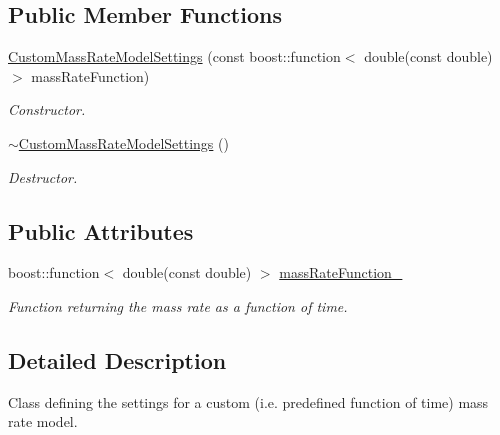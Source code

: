 \subsection*{Public Member Functions}
\begin{DoxyCompactItemize}
\item 
\hyperlink{classtudat_1_1simulation__setup_1_1CustomMassRateModelSettings_af4ba6218e0a40b784e4c519fd16240a8}{Custom\+Mass\+Rate\+Model\+Settings} (const boost\+::function$<$ double(const double) $>$ mass\+Rate\+Function)
\begin{DoxyCompactList}\small\item\em Constructor. \end{DoxyCompactList}\item 
\hyperlink{classtudat_1_1simulation__setup_1_1CustomMassRateModelSettings_ab3d265aa251c3ffdf9050322a7a94ac9}{$\sim$\+Custom\+Mass\+Rate\+Model\+Settings} ()\hypertarget{classtudat_1_1simulation__setup_1_1CustomMassRateModelSettings_ab3d265aa251c3ffdf9050322a7a94ac9}{}\label{classtudat_1_1simulation__setup_1_1CustomMassRateModelSettings_ab3d265aa251c3ffdf9050322a7a94ac9}

\begin{DoxyCompactList}\small\item\em Destructor. \end{DoxyCompactList}\end{DoxyCompactItemize}
\subsection*{Public Attributes}
\begin{DoxyCompactItemize}
\item 
boost\+::function$<$ double(const double) $>$ \hyperlink{classtudat_1_1simulation__setup_1_1CustomMassRateModelSettings_a5fc9858ae54ce1f6042af6feab31e162}{mass\+Rate\+Function\+\_\+}\hypertarget{classtudat_1_1simulation__setup_1_1CustomMassRateModelSettings_a5fc9858ae54ce1f6042af6feab31e162}{}\label{classtudat_1_1simulation__setup_1_1CustomMassRateModelSettings_a5fc9858ae54ce1f6042af6feab31e162}

\begin{DoxyCompactList}\small\item\em Function returning the mass rate as a function of time. \end{DoxyCompactList}\end{DoxyCompactItemize}


\subsection{Detailed Description}
Class defining the settings for a custom (i.\+e. predefined function of time) mass rate model. 

